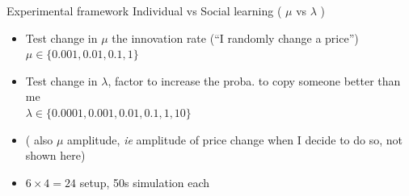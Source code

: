 \documentclass[12pt, notes=show]{beamer}
\begin{document}
\begin{frame}{Experimental framework}
Individual  vs Social learning  ( $\mu$ vs $\lambda$ )
    \begin{itemize}
	\item Test change in $\mu$ the innovation rate (``I randomly change a price'')\\
	    \hspace{.2cm} $\mu \in \{0.001,0.01,0.1,1\}$
	\item Test change in $\lambda$, factor to increase the proba. to copy someone better than me\\
	    \hspace{.2cm} $\lambda \in \{0.0001,0.001,0.01,0.1,1,10\}$
	\item ( also $\mu$ amplitude, \emph{ie} amplitude of price change when I decide to do so, not shown here)
	\item  $ 6 \times 4 = 24$ setup, 50s simulation each
    \end{itemize}
\end{frame}
\end{document}
